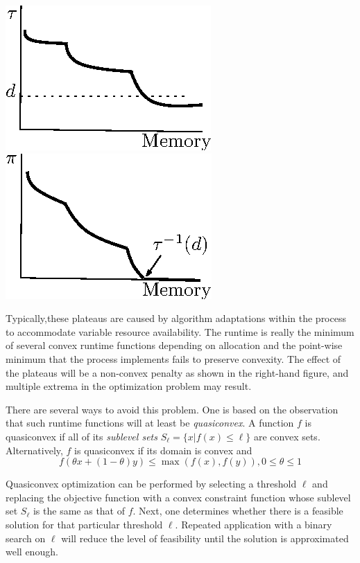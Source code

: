 \includegraphics*{Plateau1.eps}
\includegraphics*{Plateau2.eps}

Typically,these plateaus are caused by algorithm adaptations within the process to accommodate variable resource availability.  The runtime is really the minimum of several convex runtime functions depending on allocation and the point-wise minimum that the process implements fails to preserve convexity.  The effect of the plateaus will be a non-convex penalty as shown in the right-hand figure, and multiple extrema in the optimization problem may result.

There are several ways to avoid this problem.  One is based on the observation that such runtime functions
will at least be \emph{quasiconvex}.  A function $f$ is quasiconvex if all of its \emph{sublevel sets}
$S_\ell = \{x | f(x) \leq \ell\}$ are convex sets.
Alternatively, $f$ is quasiconvex if its domain is convex and
\begin{displaymath}
f(\theta x + (1-\theta)y) \leq \max(f(x),f(y)), 0 \leq \theta \leq 1
\end{displaymath}

Quasiconvex optimization can be performed by selecting a threshold $\ell$ and replacing the objective function
with a convex constraint function whose sublevel set $S_\ell$ is the same as that of $f$.
Next, one determines whether there is a feasible solution for that particular threshold $\ell$.
Repeated application with a binary search on $\ell$ will reduce the level of feasibility
until the solution is approximated well enough.

